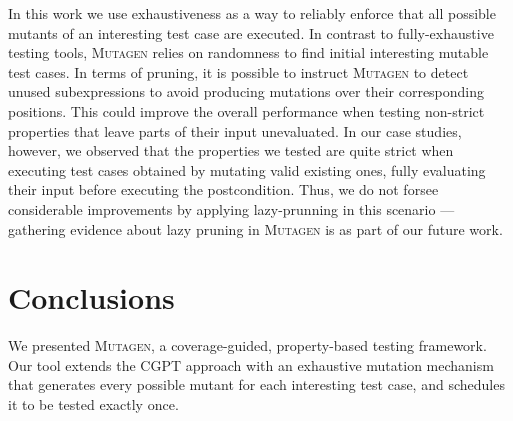 \documentclass[sigconf,review,anonymous]{acmart}
\newcommand{\mutagen}{\textsc{Mutagen}\xspace}
\begin{document}
In this work we use exhaustiveness as a way to reliably enforce that all
possible mutants of an interesting test case are executed.
%
In contrast to fully-exhaustive testing tools, \mutagen relies on randomness to
find initial interesting mutable test cases.
%
In terms of pruning, it is possible to instruct \mutagen to detect unused
subexpressions to avoid producing mutations over their corresponding positions.
%
This could improve the overall performance when testing non-strict properties
that leave parts of their input unevaluated.
%
In our case studies, however, we observed that the properties we tested
are quite strict when executing test cases obtained by mutating valid existing ones,
fully evaluating their input before executing the postcondition.
%
Thus, we do not forsee considerable improvements by applying lazy-prunning in
this scenario --- gathering evidence about lazy pruning in \mutagen is as part
of our future work.



\section{Conclusions}
\label{sec:conclusions}

We presented \mutagen, a coverage-guided, property-based testing framework.
%
%
Our tool extends the CGPT approach
with an exhaustive mutation mechanism that generates every possible mutant for
each interesting test case, and schedules it to be tested exactly once.


\end{document}
